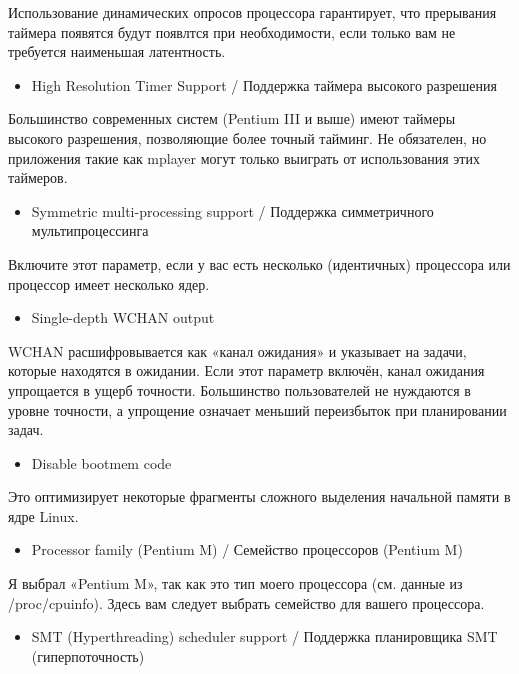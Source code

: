 \documentclass[10pt]{book}
\begin{document}
Использование динамических опросов процессора гарантирует, что прерывания таймера появятся будут появлтся при необходимости, если только вам не требуется наименьшая латентность.
\begin{itemize}
\item High Resolution Timer Support / Поддержка таймера высокого разрешения
\end{itemize}

Большинство современных систем (Pentium III и выше) имеют таймеры высокого разрешения, позволяющие более точный тайминг. Не обязателен, но приложения такие как mplayer могут только выиграть от использования этих таймеров.

\begin{itemize}
\item Symmetric multi-processing support / Поддержка симметричного мультипроцессинга                                                                                
\end{itemize}

Включите этот параметр, если у вас есть несколько (идентичных) процессора или процессор имеет несколько ядер.

\begin{itemize}
\item Single-depth WCHAN output
\end{itemize}

WCHAN расшифровывается как «канал ожидания» и указывает на задачи, которые находятся в ожидании. Если этот параметр включён, канал ожидания упрощается в ущерб точности. Большинство пользователей не нуждаются в уровне точности, а упрощение означает меньший переизбыток при планировании задач.

\begin{itemize}
\item Disable bootmem code 
\end{itemize}

Это оптимизирует некоторые фрагменты сложного выделения начальной памяти в ядре Linux.

\begin{itemize}
\item Processor family (Pentium M) / Семейство процессоров (Pentium M)
\end{itemize}

Я выбрал «Pentium M», так как это тип моего процессора (см. данные из /proc/cpuinfo). Здесь вам следует выбрать семейство для вашего процессора.

\begin{itemize}
\item SMT (Hyperthreading) scheduler support / Поддержка планировщика SMT (гиперпоточность)
\end{itemize}
\end{document}
